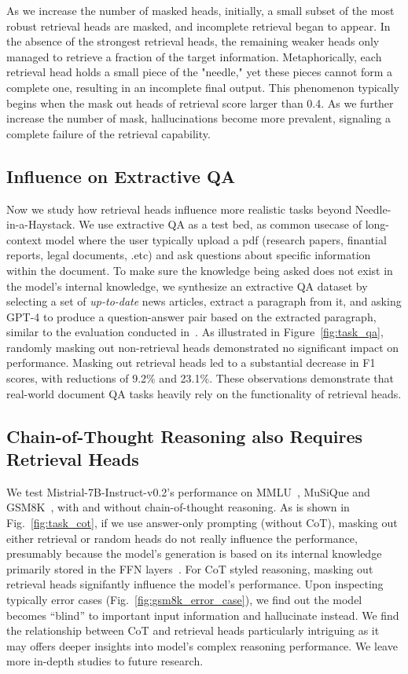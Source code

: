 As we increase the number of masked heads, initially, 
a small subset of the most robust retrieval heads are masked, and incomplete retrieval began to appear. 
In the absence of the strongest retrieval heads, the remaining weaker heads only managed to retrieve a fraction of the target information.
Metaphorically, each retrieval head holds a small piece of the "needle," yet these pieces cannot form a complete one, resulting in an incomplete final output. 
This phenomenon typically begins when the mask out heads of  retrieval score larger than 0.4.
As we further increase the number of mask, 
hallucinations become more prevalent, signaling a complete failure of the retrieval capability.

\subsection{Influence on Extractive QA}
Now we study how retrieval heads influence more realistic tasks beyond Needle-in-a-Haystack. 
We use extractive QA as a test bed, as common usecase of long-context model where the user typically upload a pdf (research papers, finantial reports, legal documents, .etc) and ask questions about specific information within the document. 
To make sure the knowledge being asked does not exist in the model's internal knowledge, we synthesize an extractive QA dataset by selecting a set of \textit{up-to-date} news articles, extract a paragraph from it, and asking GPT-4 to produce a question-answer pair based on the extracted paragraph, similar to the evaluation conducted in~\citet{claude}. 
As illustrated in Figure~\ref{fig:task_qa},
randomly masking out non-retrieval heads demonstrated no significant impact on performance. 
Masking out retrieval heads led to a substantial decrease in F1 scores, with reductions of 9.2\% and 23.1\%.
These observations demonstrate that real-world document QA tasks heavily rely on the functionality of retrieval heads. 


\subsection{Chain-of-Thought Reasoning also Requires Retrieval Heads}


We test Mistrial-7B-Instruct-v0.2's performance on MMLU~\citep{hendrycks2020measuring}, MuSiQue and GSM8K~\citep{cobbe2021training}, with and without chain-of-thought reasoning. 
As is shown in Fig.~\ref{fig:task_cot}, 
if we use answer-only prompting (without CoT), masking out either retrieval or random heads do not really influence the performance, presumably because the model's generation is based on its internal knowledge primarily stored in the FFN layers~\citep{geva2020transformer}. 
For CoT styled reasoning, masking out retrieval heads signifantly influence the model's performance. 
Upon inspecting typically error cases (Fig.~\ref{fig:gsm8k_error_case}), we find out the model becomes ``blind'' to important input information and hallucinate instead. 
We find the relationship between CoT and retrieval heads particularly intriguing as it may offers deeper insights into model's complex reasoning performance. 
We leave more in-depth studies to future research.


